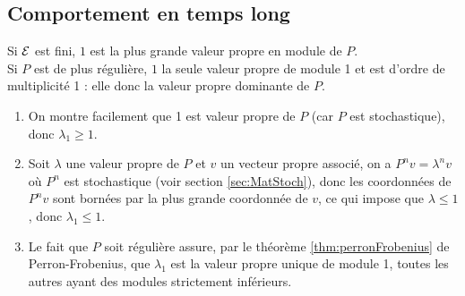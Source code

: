 % 
% 

\subsection{Comportement en temps long}  

\begin{proposition} \label{prop:perronFrobeniusCM}
  Si $\mathcal{E}$ est fini, $1$ est la plus grande valeur propre en module de $P$. \\
  Si $P$ est de plus régulière, $1$ la seule valeur propre de module 1 et est d'ordre de multiplicité 1 : elle donc la valeur propre dominante de $P$.
\end{proposition}

\proof
\begin{enumerate}
 \item On montre facilement que 1 est valeur propre de $P$ (car $P$ est stochastique), donc $\lambda_1 \geq 1$.
 \item Soit $\lambda$ une valeur propre de $P$ et $v$ un vecteur propre associé, on a $P^n v = \lambda^n v$ où $P^n$ est stochastique (voir section \ref{sec:MatStoch}), donc les coordonnées de $P^n v$ sont bornées par la plus grande coordonnée de $v$, ce qui impose que $\lambda \leq 1$, donc $\lambda_1 \leq 1$.
 \item Le fait que $P$ soit régulière assure, par le théorème \ref{thm:perronFrobenius} de Perron-Frobenius, que $\lambda_1$ est la valeur propre unique de module 1, toutes les autres ayant des modules strictement inférieurs. 
\end{enumerate}
\eproof

